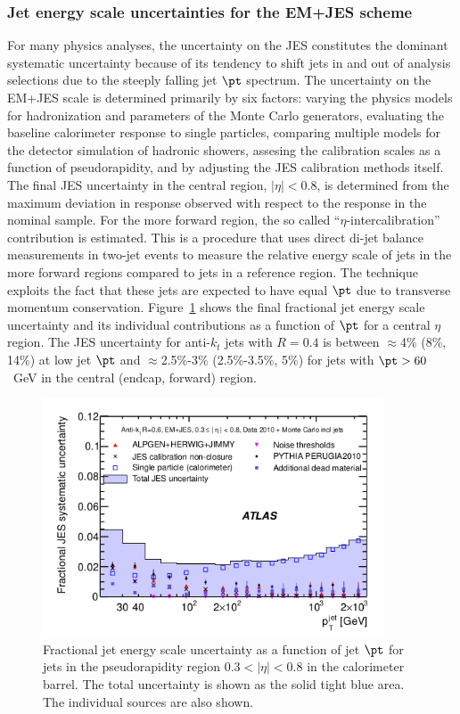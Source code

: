\subsubsection{Jet energy scale uncertainties for the EM+JES scheme}

For many physics analyses, the uncertainty on the JES constitutes the dominant systematic uncertainty because of its tendency to shift jets in and out of analysis selections due to the steeply falling jet $\pt$ spectrum. The uncertainty on the EM+JES scale  is determined primarily by six factors:  varying the physics models for hadronization and parameters of the Monte Carlo generators, evaluating the baseline calorimeter response to single particles, comparing multiple models for the detector simulation of hadronic showers, assesing the calibration scales as a function of pseudorapidity, and by adjusting the JES calibration methods itself.  The final JES uncertainty in the central region, $|\eta| < 0.8$, is determined from the maximum deviation in response observed with respect to the response in the nominal sample.  For the more forward region, the so called ``$\eta$-intercalibration'' contribution is estimated. This is a procedure that uses direct di-jet balance measurements in two-jet events to measure the relative energy scale of jets in the more forward regions compared to jets in a reference region. The technique exploits the fact that these jets are expected to have equal $\pt$ due to transverse momentum conservation. Figure~\ref{fig:JESuncertainty}  shows the final fractional jet energy scale uncertainty and its individual contributions as a function of $\pt$ for a central $\eta$ region. The JES uncertainty for anti-$k_t$ jets with $R = 0.4$ is between $\approx$4\% (8\%, 14\%) at low jet $\pt$ and $\approx$2.5\%-3\% (2.5\%-3.5\%, 5\%) for jets with $\pt > 60$~GeV in the central (endcap, forward) region.

\begin{figure}[htbp]
  \begin{center}
   \includegraphics[width=0.9\textwidth]{JESUncertainty.png}
    \caption{Fractional jet energy scale uncertainty as a function of jet $\pt$ for jets in the pseudorapidity region 0.3$ < |\eta| < $0.8 in the calorimeter barrel. The total uncertainty is shown as the solid tight blue area. The individual sources are also shown.}
    \label{fig:JESuncertainty}
  \end{center}
\end{figure}

